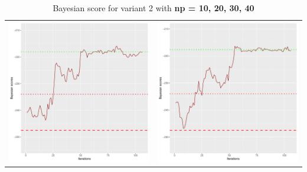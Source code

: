 \documentclass[]{scrartcl}
\begin{document}
\begin{table}[h!]
\begin{tabular}{cc}
\includegraphics[scale = 0.4]{./figs/asia/v2/30/bayBoundsEvolution-107.pdf} & 
\includegraphics[scale = 0.4]{./figs/asia/v2/40/bayBoundsEvolution-107.pdf} \\
\end{tabular}
\caption{Bayesian score for variant 2 with \textbf{np =  10, 20, 30, 40}}
\end{table}
\end{document}
